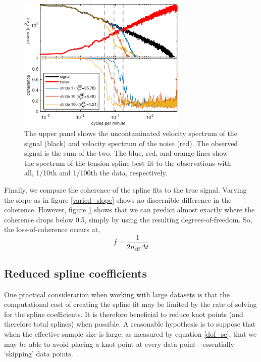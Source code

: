 \documentclass[10pt,journal]{IEEEtran}
\begin{document}
\begin{figure}
  \centerline{\includegraphics[width=19pc,angle=0]{figures/synthetic_process_and_spectrum_slope2degree3}}
  
  \caption{The upper panel shows the uncontaminated velocity spectrum of the signal (black) and velocity spectrum of the noise (red). The observed signal is the sum of the two. The blue, red, and orange lines show the spectrum of the tension spline best fit to the observations with all, 1/10th and 1/100th the data, respectively. }
  \label{synthetic_process_and_spectrum}
\end{figure}

Finally, we compare the coherence of the spline fits to the true signal. Varying the slope as in figure \ref{varied_slope} shows no discernible difference in the coherence. However, figure \ref{synthetic_process_and_spectrum} shows that we can predict almost exactly where the coherence drops below 0.5, simply by using the resulting degrees-of-freedom. So, the loss-of-coherence occurs at,
\begin{equation}
    f = \frac{1}{2 n_{\textrm{eff}} \Delta t}
\end{equation}

\subsection{Reduced spline coefficients} \label{reduced_coefficients}

One practical consideration when working with large datasets is that the computational cost of creating the spline fit may be limited by the rate of solving for the spline coefficients. It is therefore beneficial to reduce knot points (and therefore total splines) when possible. A reasonable hypothesis is to suppose that when the effective sample size is large, as measured by equation \ref{dof_se}, that we may be able to avoid placing a knot point at every data point---essentially `skipping' data points.
\end{document}
